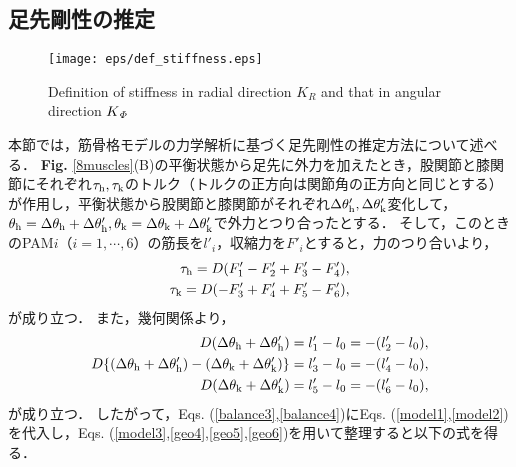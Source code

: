 \subsection{足先剛性の推定}
%
\begin{figure}[!t]
 \begin{center}
  \texttt{[image: eps/def\_stiffness.eps]}
  \caption{Definition of stiffness in radial direction $K_R$ and that in angular direction $K_{\it \Phi}$}
  \label{def_stiffness2}
 \end{center}
\end{figure}
%
本節では，筋骨格モデルの力学解析に基づく足先剛性の推定方法について述べる．
{\bf Fig. }\ref{8muscles}(B)の平衡状態から足先に外力を加えたとき，股関節と膝関節にそれぞれ$\tau_{\rm h},\tau_{\rm k}$のトルク（トルクの正方向は関節角の正方向と同じとする）が作用し，平衡状態から股関節と膝関節がそれぞれ$\Delta\theta'_{\rm h},\Delta\theta'_{\rm k}$変化して，$\theta_{\rm h}=\Delta\theta_{\rm h}+\Delta\theta'_{\rm h},\theta_{\rm k}=\Delta\theta_{\rm k}+\Delta\theta'_{\rm k}$で外力とつり合ったとする．
そして，このときのPAM$i$（$i=1,\cdots,6$）の筋長を$l'_i$，収縮力を$F'_i$とすると，力のつり合いより，
\begin{eqnarray}
 \label{balance3}
 \tau_{\rm h}=D(F'_1-F'_2+F'_3-F'_4),\\
 \label{balance4}
 \tau_{\rm k}=D(-F'_3+F'_4+F'_5-F'_6),
\end{eqnarray}
が成り立つ．
また，幾何関係より，
\begin{eqnarray}
 \label{geo4}
 D(\Delta\theta_{\rm h}+\Delta\theta'_{\rm h})=l'_1-l_0=-(l'_2-l_0),\\
 \label{geo5}
 D\{(\Delta\theta_{\rm h}+\Delta\theta'_{\rm h})-(\Delta\theta_{\rm k}+\Delta\theta'_{\rm k})\}=l'_3-l_0=-(l'_4-l_0),\\
 \label{geo6}
 D(\Delta\theta_{\rm k}+\Delta\theta'_{\rm k})=l'_5-l_0=-(l'_6-l_0),
\end{eqnarray}
が成り立つ．
したがって，Eqs. (\ref{balance3},\ref{balance4})にEqs. (\ref{model1},\ref{model2})を代入し，Eqs. (\ref{model3},\ref{geo4},\ref{geo5},\ref{geo6})を用いて整理すると以下の式を得る．
